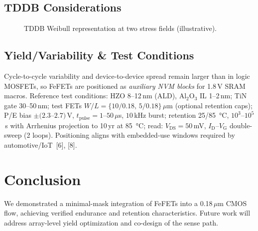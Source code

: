 \documentclass[journal]{IEEEtran}
\begin{document}
\subsection*{TDDB Considerations}
\begin{figure}[!t]
\centering
{}
\caption{TDDB Weibull representation at two stress fields (illustrative).}
\label{fig:tddb}
\end{figure}

\subsection*{Yield/Variability \& Test Conditions}
Cycle-to-cycle variability and device-to-device spread remain larger than in logic MOSFETs, so FeFETs are positioned as \textit{auxiliary NVM blocks} for 1.8\,V SRAM macros. Reference test conditions: HZO 8–12\,nm (ALD), Al$_2$O$_3$ IL 1–2\,nm; TiN gate 30–50\,nm; test FETs $W/L=\{10/0.18,\,5/0.18\}\,\mu$m (optional retention caps); P/E bias $\pm(2.3$–$2.7)$\,V, $t_\mathrm{pulse}=1$–$50\,\mu$s, $10$\,kHz burst; retention \SI{25/85}{\celsius}, $10^3$–$10^5$\,s with Arrhenius projection to 10\,yr at \SI{85}{\celsius}; read: $V_\mathrm{DS}=50$\,mV, $I_\mathrm{D}$–$V_\mathrm{G}$ double-sweep (2 loops). Positioning aligns with embedded-use windows required by automotive/IoT~[6], [8].

\section{Conclusion}
We demonstrated a minimal-mask integration of FeFETs into a 0.18\,$\mu$m CMOS flow, achieving verified endurance and retention characteristics. Future work will address array-level yield optimization and co-design of the sense path.
\end{document}
